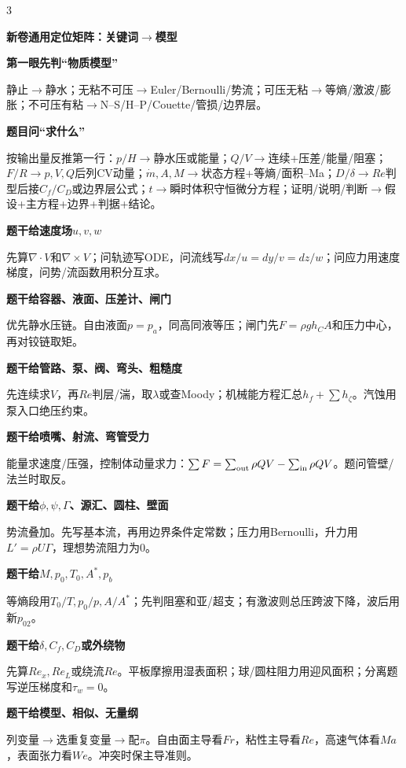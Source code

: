 \documentclass[a4paper]{article}
\newcommand{\qt}[1]{\vspace{0.25pt}\colorbox{Q}{\parbox{\dimexpr\linewidth-2\fboxsep}{\color{white}\bfseries #1}}\par}
\newcommand{\sect}[1]{\qt{#1}}
\begin{document}
\begin{multicols}{3}
{\sect{新卷通用定位矩阵：关键词$\to$模型}
\sect{第一眼先判“物质模型”}
静止$\to$静水；无粘不可压$\to$Euler/Bernoulli/势流；可压无粘$\to$等熵/激波/膨胀；不可压有粘$\to$N--S/H--P/Couette/管损/边界层。
\sect{题目问“求什么”}
按输出量反推第一行：$p/H\to$静水压或能量；$Q/V\to$连续+压差/能量/阻塞；$F/R\to p,V,Q$后列CV动量；$\dot m,A,M\to$状态方程+等熵/面积--Ma；$D/\delta\to Re$判型后接$C_f/C_D$或边界层公式；$t\to$瞬时体积守恒微分方程；证明/说明/判断$\to$假设+主方程+边界+判据+结论。
\sect{题干给速度场$u,v,w$}
先算$\nabla\cdot V$和$\nabla\times V$；问轨迹写ODE，问流线写$dx/u=dy/v=dz/w$；问应力用速度梯度，问势/流函数用积分互求。
\sect{题干给容器、液面、压差计、闸门}
优先静水压链。自由液面$p=p_a$，同高同液等压；闸门先$F=\rho gh_CA$和压力中心，再对铰链取矩。
\sect{题干给管路、泵、阀、弯头、粗糙度}
先连续求$V$，再$Re$判层/湍，取$\lambda$或查Moody；机械能方程汇总$h_f+\sum h_\zeta$。汽蚀用泵入口绝压约束。
\sect{题干给喷嘴、射流、弯管受力}
能量求速度/压强，控制体动量求力：$\sum F=\sum_{\rm out}\rho QV-\sum_{\rm in}\rho QV$。题问管壁/法兰时取反。
\sect{题干给$\phi,\psi,\Gamma$、源汇、圆柱、壁面}
势流叠加。先写基本流，再用边界条件定常数；压力用Bernoulli，升力用$L'=\rho U\Gamma$，理想势流阻力为0。
\sect{题干给$M,p_0,T_0,A^*,p_b$}
等熵段用$T_0/T,p_0/p,A/A^*$；先判阻塞和亚/超支；有激波则总压跨波下降，波后用新$p_{02}$。
\sect{题干给$\delta,C_f,C_D$或外绕物}
先算$Re_x,Re_L$或绕流$Re$。平板摩擦用湿表面积；球/圆柱阻力用迎风面积；分离题写逆压梯度和$\tau_w=0$。
\sect{题干给模型、相似、无量纲}
列变量$\to$选重复变量$\to$配$\pi$。自由面主导看$Fr$，粘性主导看$Re$，高速气体看$Ma$，表面张力看$We$。冲突时保主导准则。

}
\end{multicols}
\end{document}

